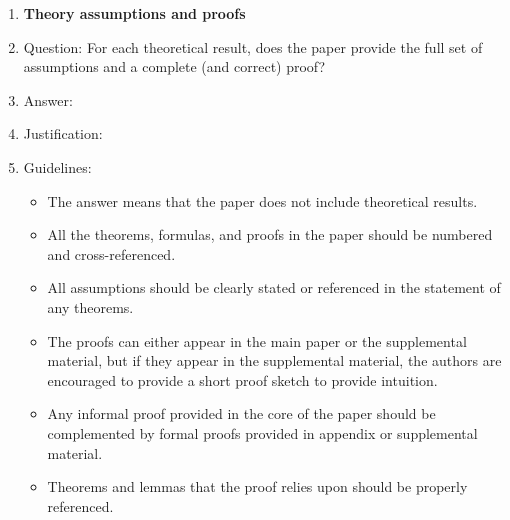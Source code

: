 \begin{enumerate}
\item {\bf Theory assumptions and proofs}
    \item[] Question: For each theoretical result, does the paper provide the full set of assumptions and a complete (and correct) proof?
    \item[] Answer: \answerTODO{}
    \item[] Justification: \justificationTODO{}
    \item[] Guidelines:
    \begin{itemize}
        \item The answer \answerNA{} means that the paper does not include theoretical results.
        \item All the theorems, formulas, and proofs in the paper should be numbered and cross-referenced.
        \item All assumptions should be clearly stated or referenced in the statement of any theorems.
        \item The proofs can either appear in the main paper or the supplemental material, but if they appear in the supplemental material, the authors are encouraged to provide a short proof sketch to provide intuition.
        \item Any informal proof provided in the core of the paper should be complemented by formal proofs provided in appendix or supplemental material.
        \item Theorems and lemmas that the proof relies upon should be properly referenced.
    \end{itemize}


\end{enumerate}
